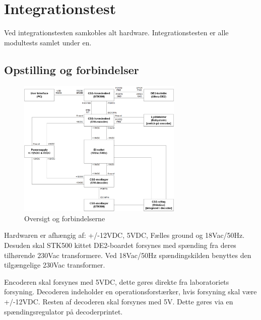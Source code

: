 \section{Integrationstest}
Ved integrationstesten samkobles alt hardware. Integrationstesten er alle modultests samlet under en. 

\subsection{Opstilling og forbindelser}

\begin{figure}[H]
	\centering
	\includegraphics[width=0.7\textwidth]{billeder/IntTest/Integration_oversigt}
	\caption{Oversigt og forbindelserne}
	\label{fig:integration_oversigt}
\end{figure}

Hardwaren er afhængig af: +/-12VDC, 5VDC, Fælles ground og 18Vac/50Hz. Desuden skal STK500 kittet DE2-boardet forsynes med spænding fra deres tilhørende 230Vac transformere. Ved 18Vac/50Hz spændingskilden benyttes den tilgængelige 230Vac transformer. 

Encoderen skal forsynes med 5VDC, dette gøres direkte fra laboratoriets forsyning.
Decoderen indeholder en operationsforstærker, hvis forsyning skal være +/-12VDC. Resten af decoderen skal forsynes med 5V. Dette gøres via en spændingsregulator på decoderprintet.   


